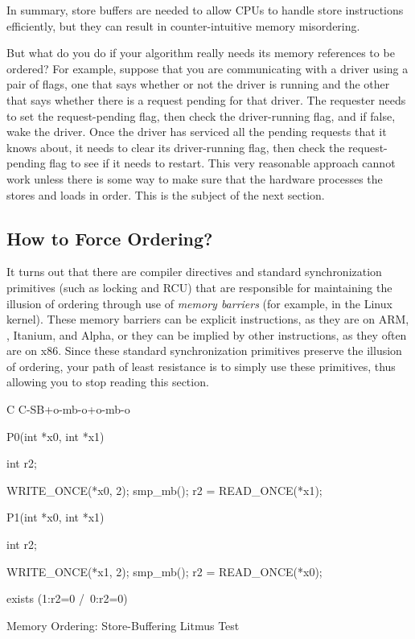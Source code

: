 In summary, store buffers are needed to allow CPUs to handle
store instructions efficiently, but they can result in
counter-intuitive memory misordering.

But what do you do if your algorithm really needs its memory
references to be ordered?
For example, suppose that you are communicating with a driver using
a pair of flags, one that says whether or not the driver is running
and the other that says whether there is a request pending for that
driver.
The requester needs to set the request-pending flag, then check
the driver-running flag, and if false, wake the driver.
Once the driver has serviced all the pending requests that it knows about,
it needs to clear its driver-running flag, then check the request-pending
flag to see if it needs to restart.
This very reasonable approach cannot work unless there is some way
to make sure that the hardware processes the stores and loads in order.
This is the subject of the next section.

\subsection{How to Force Ordering?}
\label{sec:memorder:How to Force Ordering?}

It turns out that there are compiler directives and standard
synchronization primitives (such as locking and RCU)
that are responsible for maintaining the illusion of ordering through use of
\emph{memory barriers} (for example,  in the Linux kernel).
These memory barriers can be explicit instructions, as they are on
ARM, \Power{}, Itanium, and Alpha, or they can be implied by other instructions,
as they often are on x86.
Since these standard synchronization primitives preserve the illusion of
ordering, your path of least resistance is to simply use these primitives,
thus allowing you to stop reading this section.

\begin{listing}[tbp]
{ \scriptsize
\begin{verbbox}[\LstLineNo]
C C-SB+o-mb-o+o-mb-o
{
}

P0(int *x0, int *x1)
{
  int r2;

  WRITE_ONCE(*x0, 2);
  smp_mb();
  r2 = READ_ONCE(*x1);
}


P1(int *x0, int *x1)
{
  int r2;

  WRITE_ONCE(*x1, 2);
  smp_mb();
  r2 = READ_ONCE(*x0);
}

exists (1:r2=0 /\ 0:r2=0)
\end{verbbox}
}
\centering
\theverbbox
\caption{Memory Ordering: Store-Buffering Litmus Test}
\label{lst:memorder:Memory Ordering: Store-Buffering Litmus Test}
\end{listing}


